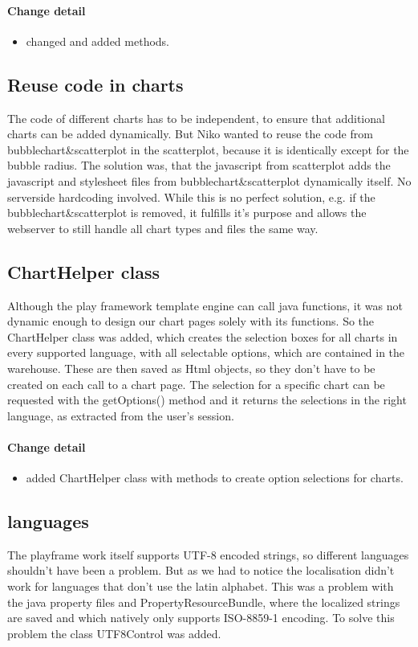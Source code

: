 \paragraph{Change detail}
\begin{itemize}
  \item changed and added methods.
\end{itemize}

\pagebreak[4]
\subsection{Reuse code in charts}
The code of different charts has to be independent, to ensure that additional charts can be added dynamically.
But Niko wanted to reuse the code from bubblechart\&scatterplot in the scatterplot,
 because it is identically except for the bubble radius. 
The solution was, that the javascript from scatterplot adds the javascript and stylesheet files 
from bubblechart\&scatterplot dynamically itself. 
No serverside hardcoding involved. While this is no perfect solution, e.g. if the bubblechart\&scatterplot is removed,
it fulfills it's purpose and allows the webserver to still handle all chart types and files the same way.

\subsection{ChartHelper class}
Although the play framework template engine can call java functions, it was not dynamic enough to design our chart pages solely with its functions.
So the ChartHelper class was added, which creates the selection boxes for all charts in every supported language, 
with all selectable options, which are contained in the warehouse.
These are then saved as Html objects, so they don't have to be created on each call to a chart page.
The selection for a specific chart can be requested with the getOptions() method and it returns the selections in the right language,
as extracted from the user's session.

\paragraph{Change detail}
\begin{itemize}
  \item added ChartHelper class with methods to create option selections for charts.
\end{itemize}

\subsection{languages}
The playframe work itself supports UTF-8 encoded strings, so different languages shouldn't have been a problem. 
But as we had to notice the localisation didn't work for languages that don't use the latin alphabet.
This was a problem with the java property files and PropertyResourceBundle, where the localized strings are saved and which natively only
supports ISO-8859-1 encoding.
To solve this problem the class UTF8Control was added.

